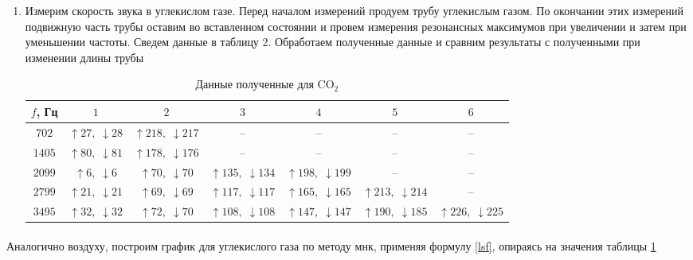 \documentclass[a4paper,12pt]{article}
\begin{document}
\begin{enumerate}
\begin{enumerate}
\item Измерим скорость звука в углекислом газе. Перед началом измерений продуем трубу углекислым газом. По окончании этих измерений подвижную часть трубы оставим во вставленном состоянии и провем измерения резонансных максимумов при увеличении и затем при уменьшении частоты. Сведем данные в таблицу 2. Обработаем полученные данные и сравним результаты с полученными при изменении длины трубы
\begin{table}[h]
\begin{small}
\begin{center}
\begin{tabular}{|c|c|c|c|c|c|c|}
\hline 
$f$, Гц & $1$ & $2$ & $3$ & $4$ & $5$ & $6$ \\ 
\hline 
$702$ & $ \uparrow 27 , \; \downarrow 28 $ & $ \uparrow 218 , \; \downarrow 217 $ & -- & -- & -- & -- \\ 
\hline 
$1405$ & $ \uparrow 80 , \; \downarrow 81 $ & $ \uparrow 178 , \; \downarrow 176 $ & -- & -- & -- & -- \\ 
\hline 
$2099$ & $ \uparrow 6 , \; \downarrow 6 $ & $ \uparrow 70 , \; \downarrow 70 $ & $ \uparrow 135 , \; \downarrow 134 $ & $ \uparrow 198 , \; \downarrow 199 $ & -- & -- \\ 
\hline 
$2799$ & $ \uparrow 21 , \; \downarrow 21 $ & $ \uparrow 69 , \; \downarrow 69 $ & $ \uparrow 117 , \; \downarrow 117 $ & $ \uparrow 165 , \; \downarrow 165 $ & $ \uparrow 213 , \; \downarrow 214 $ & -- \\ 
\hline 
$3495$ & $ \uparrow 32 , \; \downarrow 32 $ & $ \uparrow 72 , \; \downarrow 70 $ & $ \uparrow 108 , \; \downarrow 108 $ & $ \uparrow 147 , \; \downarrow 147 $ & $ \uparrow 190 , \; \downarrow 185 $ & $ \uparrow 226 , \; \downarrow 225 $ \\ 
\hline 
\end{tabular} 
\end{center}
\end{small}
\caption{Данные полученные для CO$_2$}
\label{co2}
\end{table}
\end{enumerate}
\paragraph{} Аналогично воздуху, построим график для углекислого газа по методу мнк, применяя формулу \ref{lsf}, опираясь на значения таблицы \ref{co2}


\end{enumerate}
\end{document}
